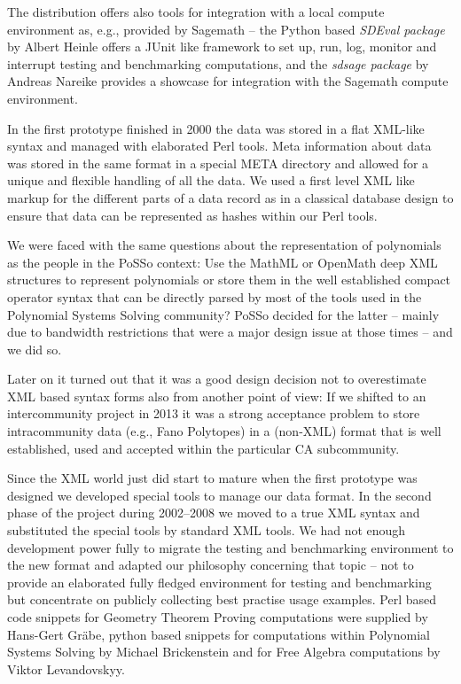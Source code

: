 \documentclass[a4paper,11pt]{article}
\begin{document}
\begin{multicols}{2}
The distribution offers also tools for integration with a local compute
environment as, e.g., provided by Sagemath \cite{Sagemath} -- the Python based
\emph{SDEval package} \cite{sdeval} by Albert Heinle offers a JUnit like
framework to set up, run, log, monitor and interrupt testing and benchmarking
computations, and the \emph{sdsage package} \cite{sdsage} by Andreas Nareike
provides a showcase for {\SD} integration with the Sagemath compute
environment.


In the first prototype finished in 2000 the data was stored in a flat XML-like
syntax and managed with elaborated Perl tools. Meta information about data was
stored in the same format in a special META directory and allowed for a unique
and flexible handling of all the data.  We used a first level XML like markup
for the different parts of a data record as in a classical database design to
ensure that data can be represented as hashes within our Perl tools.

We were faced with the same questions about the representation of polynomials
as the people in the PoSSo context: Use the MathML or OpenMath deep XML
structures to represent polynomials or store them in the well established
compact operator syntax that can be directly parsed by most of the tools used
in the Polynomial Systems Solving community? PoSSo decided for the latter --
mainly due to bandwidth restrictions that were a major design issue at those
times -- and we did so.

Later on it turned out that it was a good design decision not to overestimate
XML based syntax forms also from another point of view: If we shifted {\SD} to
an intercommunity project in 2013 it was a strong acceptance problem to store
intracommunity data (e.g., Fano Polytopes) in a (non-XML) format that is well
established, used and accepted within the particular CA subcommunity.

Since the XML world just did start to mature when the first prototype was
designed we developed special {\SD} tools to manage our data format. In the
second phase of the project during 2002--2008 we moved to a true XML syntax and
substituted the special {\SD} tools by standard XML tools. We had not enough
development power fully to migrate the testing and benchmarking environment to
the new format and adapted our philosophy concerning that topic -- not to
provide an elaborated fully fledged environment for testing and benchmarking
but concentrate on publicly collecting best practise usage examples.  Perl
based code snippets for Geometry Theorem Proving computations were supplied by
Hans-Gert Gr\"abe, python based snippets for computations within Polynomial
Systems Solving by Michael Brickenstein and for Free Algebra computations by
Viktor Levandovskyy.


\end{multicols}
\end{document}
